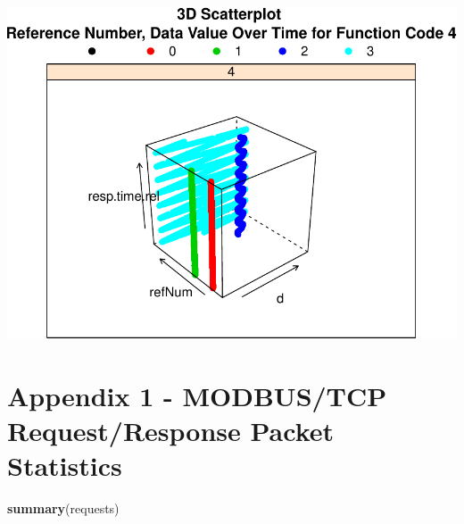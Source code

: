 \documentclass[]{article}
\newenvironment{Shaded}{\begin{snugshade}}{\end{snugshade}}
\newcommand{\KeywordTok}[1]{\textcolor[rgb]{0.13,0.29,0.53}{\textbf{{#1}}}}
\newcommand{\NormalTok}[1]{{#1}}
\begin{document}
\includegraphics{sew_files/figure-latex/unnamed-chunk-27-1.pdf}

\pagebreak

\section{Appendix 1 - MODBUS/TCP Request/Response Packet
Statistics}\label{appendix-1---modbustcp-requestresponse-packet-statistics}

\begin{Shaded}
\begin{Highlighting}[]
\KeywordTok{summary}\NormalTok{(requests)}
\end{Highlighting}
\end{Shaded}
\end{document}
